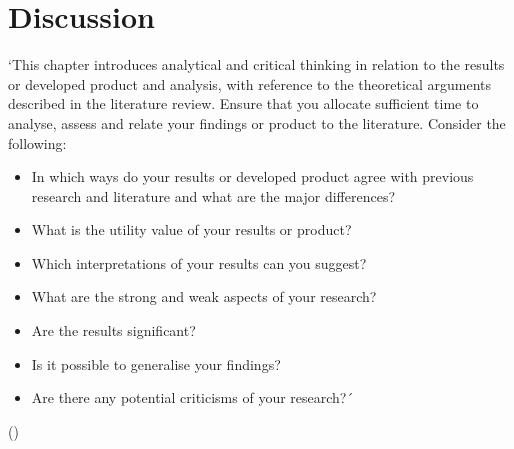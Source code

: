 \chapter{Discussion}
\label{ch:discussion}

`This chapter introduces analytical and critical thinking in relation to the results or developed
product and analysis, with reference to the theoretical arguments described in the literature
review. Ensure that you allocate sufficient time to analyse, assess and relate your findings or
product to the literature.
Consider the following:
\begin{itemize}
    \item In which ways do your results or developed product agree with previous research and
    literature and what are the major differences?
    \item What is the utility value of your results or product?
    \item Which interpretations of your results can you suggest?
    \item What are the strong and weak aspects of your research?
    \item Are the results significant?
    \item Is it possible to generalise your findings?
    \item Are there any potential criticisms of your research?´
\end{itemize} (\cite{handbook})
